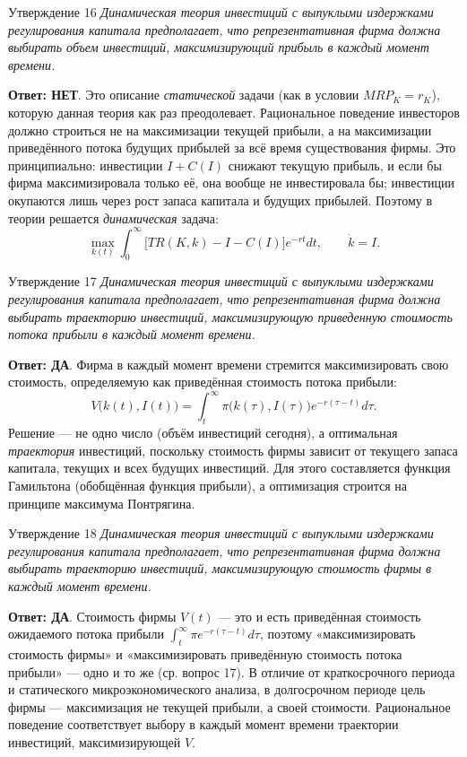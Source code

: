 \documentclass[10pt,a4paper]{article}
\newcommand{\qda}{\textbf{\color{yesgreen}Ответ: ДА}}
\newcommand{\qnet}{\textbf{\color{nored}Ответ: НЕТ}}
\newenvironment{answer}[2]{%
  \begin{qbox}{Утверждение #1}
  \textit{#2}\par\smallskip
}{%
  \end{qbox}\vspace{2pt}
}
\begin{document}
\begin{answer}{16}{Динамическая теория инвестиций с выпуклыми издержками регулирования капитала предполагает, что репрезентативная фирма должна выбирать объем инвестиций, максимизирующий прибыль в каждый момент времени.}
\qnet. Это описание \emph{статической} задачи (как в условии $MRP_K=r_K$), которую данная теория как раз преодолевает. Рациональное поведение инвесторов должно строиться не на максимизации текущей прибыли, а на максимизации приведённого потока будущих прибылей за всё время существования фирмы. Это принципиально: инвестиции $I+C(I)$ снижают текущую прибыль, и если бы фирма максимизировала только её, она вообще не инвестировала бы; инвестиции окупаются лишь через рост запаса капитала и будущих прибылей. Поэтому в теории решается \emph{динамическая} задача:
\[
\max_{k(t)}\int_0^\infty\bigl[TR(K,k)-I-C(I)\bigr]e^{-rt}dt,\qquad \dot k=I.
\]
\end{answer}

\begin{answer}{17}{Динамическая теория инвестиций с выпуклыми издержками регулирования капитала предполагает, что репрезентативная фирма должна выбирать траекторию инвестиций, максимизирующую приведенную стоимость потока прибыли в каждый момент времени.}
\qda. Фирма в каждый момент времени стремится максимизировать свою стоимость, определяемую как приведённая стоимость потока прибыли:
\[
V\bigl(k(t),I(t)\bigr)=\int_t^\infty \pi\bigl(k(\tau),I(\tau)\bigr)e^{-r(\tau-t)}d\tau.
\]
Решение --- не одно число (объём инвестиций сегодня), а оптимальная \emph{траектория} инвестиций, поскольку стоимость фирмы зависит от текущего запаса капитала, текущих и всех будущих инвестиций. Для этого составляется функция Гамильтона (обобщённая функция прибыли), а оптимизация строится на принципе максимума Понтрягина.
\end{answer}

\begin{answer}{18}{Динамическая теория инвестиций с выпуклыми издержками регулирования капитала предполагает, что репрезентативная фирма должна выбирать траекторию инвестиций, максимизирующую стоимость фирмы в каждый момент времени.}
\qda. Стоимость фирмы $V(t)$ --- это и есть приведённая стоимость ожидаемого потока прибыли $\int_t^\infty \pi e^{-r(\tau-t)}d\tau$, поэтому «максимизировать стоимость фирмы» и «максимизировать приведённую стоимость потока прибыли» --- одно и то же (ср. вопрос 17). В отличие от краткосрочного периода и статического микроэкономического анализа, в долгосрочном периоде цель фирмы --- максимизация не текущей прибыли, а своей стоимости. Рациональное поведение соответствует выбору в каждый момент времени траектории инвестиций, максимизирующей $V$.
\end{answer}
\end{document}
